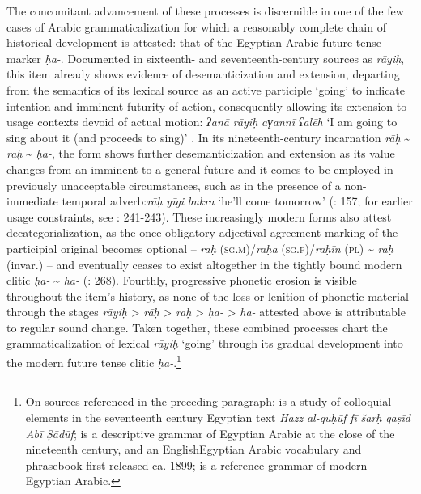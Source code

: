 \documentclass[output=paper]{langsci/langscibook}
\begin{document}
The concomitant advancement of these processes is discernible in one of the few cases of Arabic grammaticalization for which a reasonably complete chain of historical development is attested: that of the Egyptian Arabic future tense marker \textit{ḥ}\textit{a-}. Documented in sixteenth- and seventeenth-century sources as \textit{rāy}\textit{iḥ}, this item already shows evidence of desemanticization and extension, departing from the semantics of its lexical source as an active participle ‘going’ to indicate intention and imminent futurity of action, consequently allowing its extension to usage contexts devoid of actual motion: \textit{ʔan}\textit{ā} \textit{r}\textit{āyi}\textit{ḥ} \textit{aɣannī} \textit{ʕalēh} ‘I am going to sing about it (and proceeds to sing)’ \citep[241]{Davies1981}. In its nineteenth-century incarnation \textit{rāḥ} {\textasciitilde} \textit{raḥ} {\textasciitilde} \textit{ḥa-}, the form shows further desemanticization and extension as its value changes from an imminent to a general future and it comes to be employed in previously unacceptable circumstances, such as in the presence of a non-immediate temporal adverb:\textit{rāḥ} \textit{yīgi} \textit{bukra} ‘he’ll come tomorrow’ (\citealt{Elias1981}: 157; for earlier usage constraints, see \citealt{Davies1981}: 241-243). These increasingly modern forms also attest decategorialization, as the once-obligatory adjectival agreement marking of the participial original becomes optional – \textit{raḥ} (\textsc{sg.m})/\textit{raḥ}\textit{a} (\textsc{sg.f})/\textit{raḥī}\textit{n} (\textsc{pl}) {\textasciitilde} \textit{raḥ} (invar.) \citep[40]{Vollers1895} – and eventually ceases to exist altogether in the tightly bound modern clitic \textit{ḥa-} {\textasciitilde} \textit{ha-} (\citealt{Abdel-Massih2009}: 268). Fourthly, progressive phonetic erosion is visible throughout the item’s history, as none of the loss or lenition of phonetic material through the stages \textit{rāyiḥ} > \textit{rāḥ} > \textit{raḥ} > \textit{ḥa-} > \textit{ha-} attested above is attributable to regular sound change. Taken together, these combined processes chart the grammaticalization of lexical \textit{rāyiḥ} ‘going’ through its gradual development into the modern future tense clitic \textit{ḥa-}.\footnote{On sources referenced in the preceding paragraph: \citet{Davies1981} is a study of colloquial elements in the seventeenth century Egyptian text \textit{Hazz} \textit{al-quḥūf} \textit{fī} \textit{šarḥ} \textit{qaṣīd} \textit{Abī} \textit{Ṣādūf}; \citet{Vollers1895} is a descriptive grammar of Egyptian Arabic at the close of the nineteenth century, and \citet{Elias1981} an English\textendash Egyptian Arabic vocabulary and phrasebook first released ca. 1899;  \citet{Abdel-Massih2009} is a reference grammar of modern Egyptian Arabic.}
\end{document}
